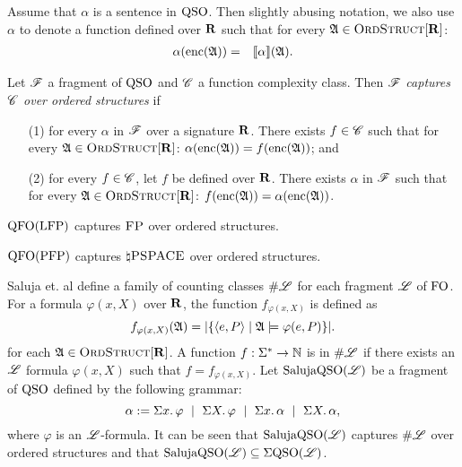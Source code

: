 

Assume that $\alpha$ is a sentence in ${\rm QSO}$. Then slightly abusing notation, we also use $\alpha$ to denote a function defined over $\mathbf{R}$ such that for every $\mathfrak{A} \in \text{\sc OrdStruct}[\mathbf{R}] $:
\begin{eqnarray*}
	\alpha({\rm enc}(\mathfrak{A})) & = & {\llbracket{}{\alpha}\rrbracket}(\mathfrak{A}).
\end{eqnarray*}
\begin{definition} \label{cap-def}
	Let $\mathscr{F}$ a fragment of ${\rm QSO}$ and $\mathscr{C}$ a function complexity class. Then $\mathscr{F}$ {\em captures $\mathscr{C}$ over ordered structures} if 
	
	\begin{itemize}
	\item[(1)] for every $\alpha$ in $\mathscr{F}$ over a signature $\mathbf{R}$. There exists $f \in \mathscr{C}$ such that for every $\mathfrak{A} \in \text{\sc OrdStruct}[\mathbf{R}]$:  $\alpha({\rm enc}(\mathfrak{A})) = f({\rm enc}(\mathfrak{A}))$; and 
		
	\item[(2)] for every $f \in \mathscr{C}$, let $f$ be defined over $\mathbf{R}$. There exists $\alpha$ in $\mathscr{F}$ such that for every $\mathfrak{A} \in \text{\sc OrdStruct}[\mathbf{R}]$:  $f({\rm enc}(\mathfrak{A})) = \alpha({\rm enc}(\mathfrak{A}))$.
	\end{itemize} 
\end{definition}

\begin{theorem} \label{captfp}
	${\rm QFO}({\rm LFP})$ captures $\text{\sc FP}$ over ordered structures.
\end{theorem}

\begin{theorem} \label{qfo-pfp-cap}
	${\rm QFO}({\rm PFP})$ captures $\natural\text{\sc PSPACE}$ over ordered structures.
\end{theorem}

Saluja et. al \cite{DBLP:journals/jcss/SalujaST95} define a family of counting classes $\#\mathscr{L}$ for each fragment $\mathscr{L}$ of ${\rm FO}$. For a formula $\varphi(x,X)$ over $\mathbf{R}$, the function $f_{\varphi(x,X)}$ is defined as
\[
f_{\varphi(x,X)}(\mathfrak{A}) = \vert \{\langle e,P\rangle\mid \mathfrak{A}\models\varphi(e,P)\}\vert.
\]
for each $\mathfrak{A}\in\text{\sc OrdStruct}[\mathbf{R}]$. A function $f:\Sigma^*\to\mathbb{N}$ is in $\#\mathscr{L}$ if there exists an $\mathscr{L}$ formula $\varphi(x,X)$ such that $f = f_{\varphi(x,X)}$. Let $\text{\rm Saluja}{\rm QSO}(\mathscr{L})$ be a fragment of ${\rm QSO}$ defined by the following grammar:
\[
\alpha := \Sigma{x}.\,\varphi \ \mid \ \Sigma{X}.\, \varphi \ \mid \ \Sigma{x}.\,\alpha \ \mid \ \Sigma{X}.\,\alpha,
\]
where $\varphi$ is an $\mathscr{L}$-formula. It can be seen that $\text{\rm Saluja}{\rm QSO}(\mathscr{L})$ captures $\#\mathscr{L}$ over ordered structures and that $\text{\rm Saluja}{\rm QSO}(\mathscr{L}) \subseteq \Sigma{\rm QSO}(\mathscr{L})$. 

